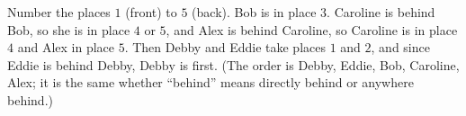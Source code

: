 Number the places $1$ (front) to $5$ (back). Bob is in place $3$. Caroline is behind Bob, so she is in place $4$ or $5$, and Alex is behind Caroline, so Caroline is in place $4$ and Alex in place $5$. Then Debby and Eddie take places $1$ and $2$, and since Eddie is behind Debby, $\boxed{\text{Debby}}$ is first. (The order is Debby, Eddie, Bob, Caroline, Alex; it is the same whether ``behind'' means directly behind or anywhere behind.)
